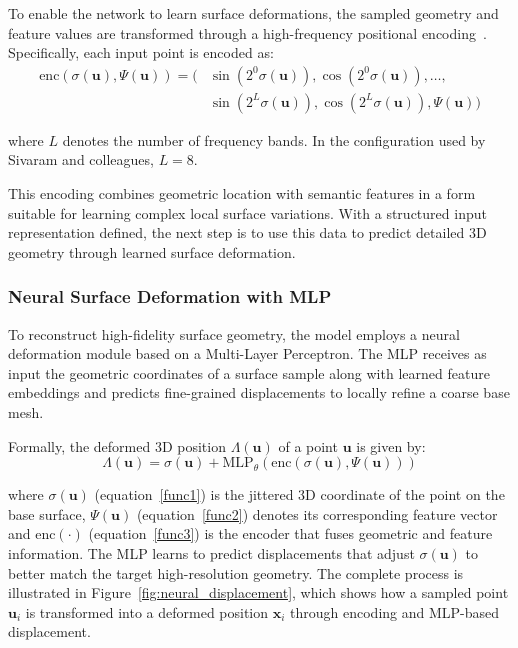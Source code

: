To enable the network to learn surface deformations, the sampled geometry and feature values are transformed through a high-frequency positional encoding~\cite{mildenhall2020}.  
Specifically, each input point is encoded as:  
\begin{equation}
\begin{aligned}
\text{enc}(\sigma(\mathbf{u}), \Psi(\mathbf{u})) = \big(&
\sin(2^0 \sigma(\mathbf{u})), \cos(2^0 \sigma(\mathbf{u})), \ldots, \\
&\sin(2^L \sigma(\mathbf{u})), \cos(2^L \sigma(\mathbf{u})), 
\Psi(\mathbf{u})
\big)
\end{aligned}
\label{func3}
\end{equation}

where \( L \) denotes the number of frequency bands.  
In the configuration used by Sivaram and colleagues, \( L = 8 \).

This encoding combines geometric location with semantic features in a form suitable for learning complex local surface variations.  
With a structured input representation defined, the next step is to use this data to predict detailed 3D geometry through learned surface deformation.  

\subsubsection{Neural Surface Deformation with MLP}

To reconstruct high-fidelity surface geometry, the model employs a neural deformation module based on a Multi-Layer Perceptron.  
The MLP receives as input the geometric coordinates of a surface sample along with learned feature embeddings and predicts fine-grained displacements to locally refine a coarse base mesh.

Formally, the deformed 3D position $\Lambda(\mathbf{u})$ of a point $\mathbf{u}$ is given by:
\begin{equation*}
\Lambda(\mathbf{u}) = \sigma(\mathbf{u}) + \text{MLP}_\theta\left( \text{enc}(\sigma(\mathbf{u}), \Psi(\mathbf{u})) \right)
\end{equation*}

where $\sigma(\mathbf{u})$ (equation~\ref{func1}) is the jittered 3D coordinate of the point on the base surface, $\Psi(\mathbf{u})$ (equation~\ref{func2}) denotes its corresponding feature vector and $\text{enc}(\cdot)$ (equation~\ref{func3}) is the encoder that fuses geometric and feature information.
The MLP learns to predict displacements that adjust $\sigma(\mathbf{u})$ to better match the target high-resolution geometry.
The complete process is illustrated in Figure~\ref{fig:neural_displacement}, which shows how a sampled point $\mathbf{u}_i$ is transformed into a deformed position $\mathbf{x}_i$ through encoding and MLP-based displacement.

